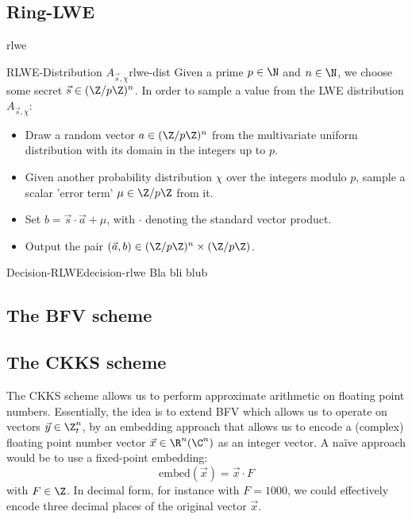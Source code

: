 \subsection{Ring-LWE}
\Gls{rlwe}
\cite{2010-rlwe-original}
\begin{corollary}{RLWE-Distribution $A_{\vec{s}, \chi}$}{rlwe-dist}
  Given a prime $p \in \N$ and $n \in \N$, we choose some secret $\vec{s} \in (\Z / p \Z)^n$.
  In order to sample a value from the LWE distribution $A_{\vec{s}, \chi}$:
  \begin{itemize}
    \item Draw a random vector $a \in (\Z/p\Z)^n$ from the multivariate uniform distribution
          with its domain in the integers up to $p$.
    \item Given another probability distribution $\chi$ over the integers modulo $p$,
          sample a scalar 'error term' $\mu \in \Z / p \Z$ from it.
    \item Set $b = \vec{s} \cdot \vec{a} + \mu$, with $\cdot$ denoting the standard vector product.
    \item Output the pair $(\vec{a}, b) \in (\Z / p \Z)^n \times (\Z / p \Z)$.
  \end{itemize}
\end{corollary}

\begin{definition}{Decision-RLWE}{decision-rlwe}
  Bla bli blub
\end{definition}


\subsection{The BFV scheme}
\cite{2012-fv-original}
\cite{2012-brakerski}

\subsection{The CKKS scheme}
The CKKS scheme allows us to perform approximate arithmetic on floating point numbers.
Essentially, the idea is to extend BFV which allows us to operate on vectors $\vec{y} \in \Z_t^n$,
by an embedding approach that allows us to encode a (complex) floating point number vector $\vec{x} \in \R^n (\C^n)$
as an integer vector. A na\"ive approach would be to use a fixed-point embedding:
\newcommand{\embed}{\mathrm{embed}}
$$\embed(\vec{x}) = \vec{x} \cdot F$$
with $F \in \Z$. In decimal form, for instance with $F = 1000$, we could effectively encode
three decimal places of the original vector $\vec{x}$.

